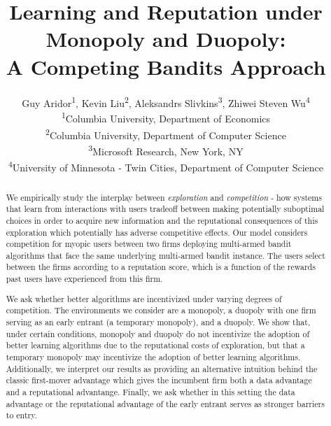 \documentclass{article}
\theoremstyle{definition}
\begin{document}
\title{Learning and Reputation under Monopoly and Duopoly: \\A Competing Bandits Approach}

\author{Guy Aridor\textsuperscript{1}, Kevin Liu\textsuperscript{2}, Aleksandrs Slivkins\textsuperscript{3},
Zhiwei Steven Wu\textsuperscript{4} \\
{\textsuperscript{1}Columbia University, Department of Economics}\\
{\textsuperscript{2}Columbia University, Department of Computer Science}\\
{\textsuperscript{3}Microsoft Research, New York, NY}\\
{\textsuperscript{4}University of Minnesota - Twin Cities, Department of Computer Science}
}
\maketitle

\begin{abstract}
We empirically study the interplay between \textit{exploration} and \textit{competition} - how systems that learn from interactions with users tradeoff between making potentially suboptimal choices in order to acquire new information and the reputational consequences of this exploration which potentially has adverse competitive effects. Our model considers competition for myopic users between two firms deploying multi-armed bandit algorithms that face the same underlying multi-armed bandit instance. The users select between the firms according to a reputation score, which is a function of the rewards past users have experienced from this firm.

We ask whether better algorithms are incentivized under varying degrees of competition. The environments we consider are a monopoly, a duopoly with one firm serving as an early entrant (a temporary monopoly), and a duopoly. We show that, under certain conditions, monopoly and duopoly do not incentivize the adoption of better learning algorithms due to the reputational costs of exploration, but that a temporary monopoly may incentivize the adoption of better learning algorithms. Additionally, we interpret our results as providing an alternative intuition behind the classic first-mover advantage which gives the incumbent firm both a data advantage and a reputational advantange. Finally, we ask whether in this setting the data advantage or the reputational advantage of the early entrant serves as stronger barriers to entry.
\end{abstract}
\end{document}
